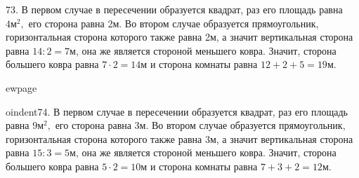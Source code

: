 73. В первом случае в пересечении образуется квадрат, раз его площадь равна $4\text{м}^2,$ его сторона равна 2м. Во втором случае образуется прямоугольник, горизонтальная сторона которого также равна 2м, а значит вертикальная сторона равна $14:2=7$м, она же является стороной меньшего ковра. Значит, сторона большего ковра равна $7\cdot2=14$м и сторона комнаты равна $12+2+5=19$м.
\begin{center}
\begin{figure}[ht!]
\end{figure}
\end{center}

ewpage

oindent74. В первом случае в пересечении образуется квадрат, раз его площадь равна $9\text{м}^2,$ его сторона равна 3м. Во втором случае образуется прямоугольник, горизонтальная сторона которого также равна 3м, а значит вертикальная сторона равна $15:3=5$м, она же является стороной меньшего ковра. Значит, сторона большего ковра равна $5\cdot2=10$м и сторона комнаты равна $7+3+2=12$м.
\begin{center}
\begin{figure}[ht!]
\end{figure}
\end{center}

